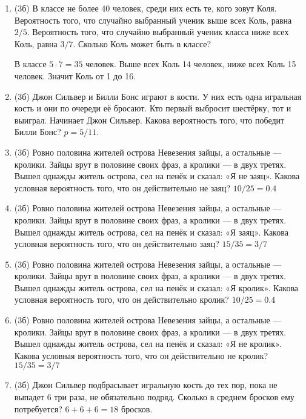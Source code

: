 \documentclass[a4paper, 12pt]{article}
\begin{document}
\newpage
\begin{enumerate}
\item (3б) В классе не более 40 человек, среди них есть те, кого зовут Коля. Вероятность того, что случайно выбранный ученик выше всех Коль, равна $2/5$. Вероятность того, что случайно выбранный ученик класса ниже всех Коль, равна $3/7$. Сколько Коль может быть в классе?

В классе $5\cdot 7=35$ человек. Выше всех Коль 14 человек, ниже всех Коль 15 человек. Значит Коль от 1 до 16.
\item (3б) Джон Сильвер и Билли Бонс играют в кости. У них есть одна игральная кость и они по очереди её бросают. Кто первый выбросит шестёрку, тот и выиграл. Начинает Джон Сильвер. Какова вероятность того, что победит Билли Бонс? $p=5/11$.
\item (3б) Ровно половина жителей острова Невезения зайцы, а остальные — кролики. Зайцы врут в половине своих фраз, а кролики — в двух третях. Вышел однажды житель острова, сел на пенёк и сказал: «Я не заяц». Какова условная вероятность того, что он действительно не заяц? $10/25=0.4$
\item (3б) Ровно половина жителей острова Невезения зайцы, а остальные — кролики. Зайцы врут в половине своих фраз, а кролики — в двух третях. Вышел однажды житель острова, сел на пенёк и сказал: «Я заяц». Какова условная вероятность того, что он действительно заяц? $15/35=3/7$
\item (3б) Ровно половина жителей острова Невезения зайцы, а остальные — кролики. Зайцы врут в половине своих фраз, а кролики — в двух третях. Вышел однажды житель острова, сел на пенёк и сказал: «Я кролик». Какова условная вероятность того, что он действительно кролик? $10/25=0.4$
\item (3б) Ровно половина жителей острова Невезения зайцы, а остальные — кролики. Зайцы врут в половине своих фраз, а кролики — в двух третях. Вышел однажды житель острова, сел на пенёк и сказал: «Я не кролик». Какова условная вероятность того, что он действительно не кролик? $15/35=3/7$
\item (3б) Джон Сильвер подбрасывает игральную кость до тех пор, пока не выпадет 6 три раза, не обязательно подряд. Сколько в среднем бросков ему потребуется? $6+6+6=18$ бросков.

\end{enumerate}
\end{document}
